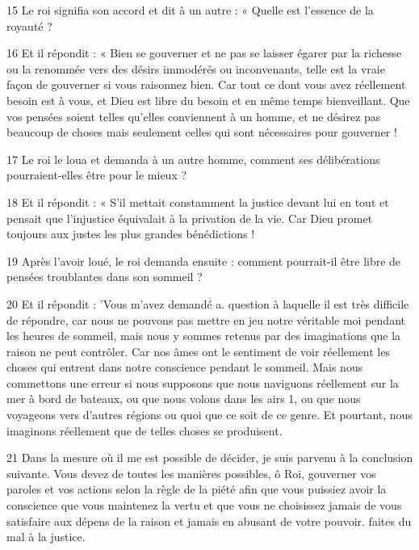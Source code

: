 \par 15 Le roi signifia son accord et dit à un autre : « Quelle est l'essence de la royauté ?

\par 16 Et il répondit : « Bien se gouverner et ne pas se laisser égarer par la richesse ou la renommée vers des désirs immodérés ou inconvenants, telle est la vraie façon de gouverner si vous raisonnez bien. Car tout ce dont vous avez réellement besoin est à vous, et Dieu est libre du besoin et en même temps bienveillant. Que vos pensées soient telles qu'elles conviennent à un homme, et ne désirez pas beaucoup de choses mais seulement celles qui sont nécessaires pour gouverner !

\par 17 Le roi le loua et demanda à un autre homme, comment ses délibérations pourraient-elles être pour le mieux ?

\par 18 Et il répondit : « S'il mettait constamment la justice devant lui en tout et pensait que l'injustice équivalait à la privation de la vie. Car Dieu promet toujours aux justes les plus grandes bénédictions !

\par 19 Après l'avoir loué, le roi demanda ensuite : comment pourrait-il être libre de pensées troublantes dans son sommeil ?

\par 20 Et il répondit : 'Vous m'avez demandé a. question à laquelle il est très difficile de répondre, car nous ne pouvons pas mettre en jeu notre véritable moi pendant les heures de sommeil, mais nous y sommes retenus par des imaginations que la raison ne peut contrôler. Car nos âmes ont le sentiment de voir réellement les choses qui entrent dans notre conscience pendant le sommeil. Mais nous commettons une erreur si nous supposons que nous naviguons réellement sur la mer à bord de bateaux, ou que nous volons dans les airs 1, ou que nous voyageons vers d'autres régions ou quoi que ce soit de ce genre. Et pourtant, nous imaginons réellement que de telles choses se produisent.

\par 21 Dans la mesure où il me est possible de décider, je suis parvenu à la conclusion suivante. Vous devez de toutes les manières possibles, ô Roi, gouverner vos paroles et vos actions selon la règle de la piété afin que vous puissiez avoir la conscience que vous maintenez la vertu et que vous ne choisissez jamais de vous satisfaire aux dépens de la raison et jamais en abusant de votre pouvoir. faites du mal à la justice.

